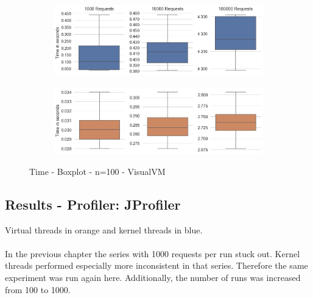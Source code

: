 \begin{figure}[H]
  \centering
  \begin{subfigure}[b]{1.0\textwidth}
    \includegraphics[width=1.0\linewidth]{img/footprint/boxplots-t-100.png}
  \end{subfigure}
  \par\medskip %
  \begin{subfigure}[b]{1.0\textwidth}
    \includegraphics[width=1.0\linewidth]{img/footprint/boxplots-vt-100.png}
  \end{subfigure}
  \caption{Time - Boxplot - n=100 - VisualVM}
\end{figure}




\pagebreak
\subsection{Results - Profiler: JProfiler}
Virtual threads in orange and kernel threads in blue.
\\
\\
In the previous chapter the series with 1000 requests per run stuck out. Kernel threads performed especially more inconsistent in that series. Therefore the same experiment was run again here. Additionally, the number of runs was increased from 100 to 1000.

